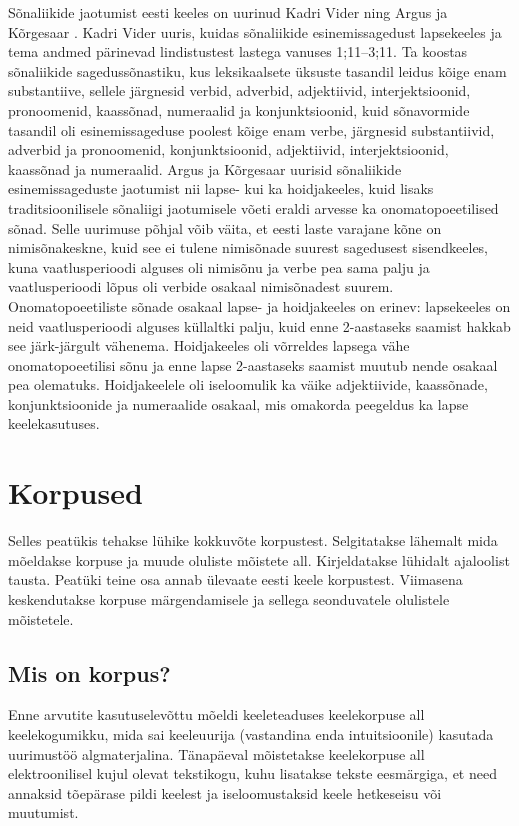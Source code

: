 \documentclass[12pt]{article}
\begin{document}
Sõnaliikide jaotumist eesti keeles on uurinud Kadri Vider \citep{Vider} ning Argus ja Kõrgesaar \citep{Argus_3}. Kadri Vider uuris, kuidas sõnaliikide esinemissagedust lapsekeeles ja tema andmed pärinevad lindistustest lastega vanuses 1;11--3;11. Ta koostas sõnaliikide sagedussõnastiku, kus leksikaalsete üksuste tasandil leidus kõige enam substantiive, sellele järgnesid verbid, adverbid, adjektiivid, interjektsioonid, pronoomenid, kaassõnad, numeraalid ja konjunktsioonid, kuid sõnavormide tasandil oli esinemissageduse poolest kõige enam verbe, järgnesid substantiivid, adverbid ja pronoomenid, konjunktsioonid, adjektiivid, interjektsioonid, kaassõnad ja numeraalid. \citep{Vider} Argus ja Kõrgesaar uurisid sõnaliikide esinemissageduste jaotumist nii lapse- kui ka hoidjakeeles, kuid lisaks traditsioonilisele sõnaliigi jaotumisele võeti eraldi arvesse ka onomatopoeetilised sõnad. Selle uurimuse põhjal võib väita, et eesti laste varajane kõne on nimisõnakeskne, kuid see ei tulene nimisõnade suurest sagedusest sisendkeeles, kuna vaatlusperioodi alguses oli nimisõnu ja verbe pea sama palju ja vaatlusperioodi lõpus oli verbide osakaal nimisõnadest suurem. Onomatopoeetiliste sõnade osakaal lapse- ja hoidjakeeles on erinev: lapsekeeles on neid vaatlusperioodi alguses küllaltki palju, kuid enne 2-aastaseks saamist hakkab see järk-järgult vähenema. Hoidjakeeles oli võrreldes lapsega vähe onomatopoeetilisi sõnu ja enne lapse 2-aastaseks saamist muutub nende osakaal pea olematuks. Hoidjakeelele oli iseloomulik ka väike adjektiivide, kaassõnade, konjunktsioonide ja numeraalide osakaal, mis omakorda peegeldus ka lapse keelekasutuses. \citep{Argus_3}



\newpage
\section{Korpused}
Selles peatükis tehakse lühike kokkuvõte korpustest. Selgitatakse lähemalt mida mõeldakse korpuse ja muude
oluliste mõistete all. Kirjeldatakse lühidalt ajaloolist tausta. Peatüki teine osa annab ülevaate eesti keele korpustest. Viimasena keskendutakse korpuse märgendamisele ja sellega seonduvatele olulistele mõistetele.

\subsection{Mis on korpus?}
Enne arvutite kasutuselevõttu mõeldi keeleteaduses keelekorpuse all keelekogumikku, mida sai keeleuurija (vastandina enda intuitsioonile) kasutada uurimustöö algmaterjalina. Tänapäeval mõistetakse
keelekorpuse all elektroonilisel kujul olevat tekstikogu, kuhu lisatakse tekste eesmärgiga, et need annaksid
tõepärase pildi keelest ja iseloomustaksid keele hetkeseisu või muutumist. \citep[9]{KR}
\end{document}
